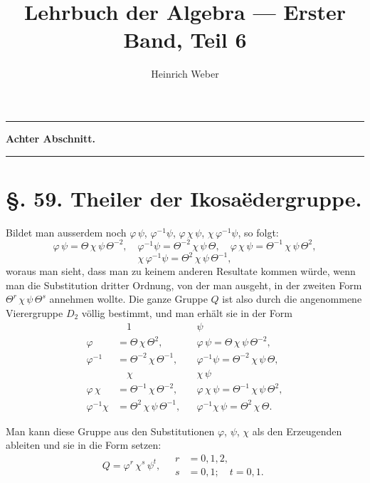 \documentclass[12pt,a4paper]{article}
\title{Lehrbuch der Algebra --- Erster Band, Teil 6}
\author{Heinrich Weber}
\date{}
\theoremstyle{plain}
\theoremstyle{definition}
\theoremstyle{remark}
\begin{document}
\maketitle

\noindent\rule{\textwidth}{0.4pt}
\begin{center}\textbf{Achter Abschnitt.}\end{center}
\noindent\rule{\textwidth}{0.4pt}


\section*{\S. 59. Theiler der Ikosa\"edergruppe.}

Bildet man ausserdem noch $\varphi\,\psi$, $\varphi^{-1}\psi$, $\varphi\,\chi\,\psi$, $\chi\,\varphi^{-1}\psi$, so folgt:
\[
\varphi\,\psi = \Theta\,\chi\,\psi\,\Theta^{-2},\quad
\varphi^{-1}\psi = \Theta^{-2}\,\chi\,\psi\,\Theta,\quad
\varphi\,\chi\,\psi = \Theta^{-1}\,\chi\,\psi\,\Theta^{2},
\]
\[
\chi\,\varphi^{-1}\psi = \Theta^{2}\,\chi\,\psi\,\Theta^{-1},
\]
woraus man sieht, dass man zu keinem anderen Resultate kommen w\"urde, wenn man die Substitution dritter Ordnung, von der man ausgeht, in der zweiten Form $\Theta^{r}\,\chi\,\psi\,\Theta^{s}$ annehmen wollte. Die ganze Gruppe $Q$ ist also durch die angenommene Vierergruppe $D_{2}$ v\"ollig bestimmt, und man erh\"alt sie in der Form
\begin{equation}\tag{3}
\begin{aligned}
&\quad 1 && \psi \\
\varphi &= \Theta\,\chi\,\Theta^{2}, && \varphi\,\psi = \Theta\,\chi\,\psi\,\Theta^{-2}, \\
\varphi^{-1} &= \Theta^{-2}\,\chi\,\Theta^{-1}, && \varphi^{-1}\psi = \Theta^{-2}\,\chi\,\psi\,\Theta, \\
&\quad \chi && \chi\,\psi \\
\varphi\,\chi &= \Theta^{-1}\,\chi\,\Theta^{-2}, && \varphi\,\chi\,\psi = \Theta^{-1}\,\chi\,\psi\,\Theta^{2}, \\
\varphi^{-1}\chi &= \Theta^{2}\,\chi\,\psi\,\Theta^{-1}, && \varphi^{-1}\chi\,\psi = \Theta^{2}\,\chi\,\Theta.
\end{aligned}
\end{equation}

Man kann diese Gruppe aus den Substitutionen $\varphi$, $\psi$, $\chi$ als den Erzeugenden ableiten und sie in die Form setzen:
\begin{equation}\tag{4}
Q = \varphi^{r}\,\chi^{s}\,\psi^{t},\quad
\begin{aligned}
r &= 0, 1, 2, \\
s &= 0, 1;\quad t = 0, 1.
\end{aligned}
\end{equation}
\end{document}
